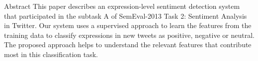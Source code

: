 Abstract This paper describes an expression-level sentiment detection system that participated in the subtask A of SemEval-2013 Task 2: Sentiment Analysis
 in Twitter. Our system uses a supervised approach to learn the features from
 the training data to classify expressions in new tweets as positive, negative
 or neutral. The proposed approach helps to understand the relevant features
 that contribute most in this classification task.

